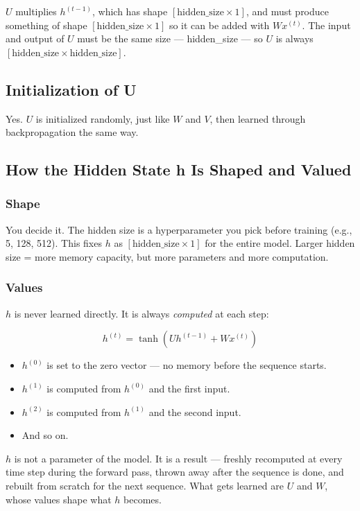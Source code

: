 \documentclass[12pt,a4paper]{article}
\begin{document}
$U$ multiplies $h^{(t-1)}$, which has shape $[\text{hidden\_size} \times 1]$, and must produce something of shape $[\text{hidden\_size} \times 1]$ so it can be added with $W x^{(t)}$. The input and output of $U$ must be the same size --- hidden\_size --- so $U$ is always $[\text{hidden\_size} \times \text{hidden\_size}]$.


\subsection{Initialization of U}

Yes. $U$ is initialized randomly, just like $W$ and $V$, then learned through backpropagation the same way.


\subsection{How the Hidden State h Is Shaped and Valued}

\subsubsection{Shape}

You decide it. The hidden size is a hyperparameter you pick before training (e.g., 5, 128, 512). This fixes $h$ as $[\text{hidden\_size} \times 1]$ for the entire model. Larger hidden size = more memory capacity, but more parameters and more computation.

\subsubsection{Values}

$h$ is never learned directly. It is always \textit{computed} at each step:

\[
h^{(t)} = \tanh\!\left(U h^{(t-1)} + W x^{(t)}\right)
\]

\begin{itemize}
    \item $h^{(0)}$ is set to the zero vector --- no memory before the sequence starts.
    \item $h^{(1)}$ is computed from $h^{(0)}$ and the first input.
    \item $h^{(2)}$ is computed from $h^{(1)}$ and the second input.
    \item And so on.
\end{itemize}

$h$ is not a parameter of the model. It is a result --- freshly recomputed at every time step during the forward pass, thrown away after the sequence is done, and rebuilt from scratch for the next sequence. What gets learned are $U$ and $W$, whose values shape what $h$ becomes.
\end{document}
